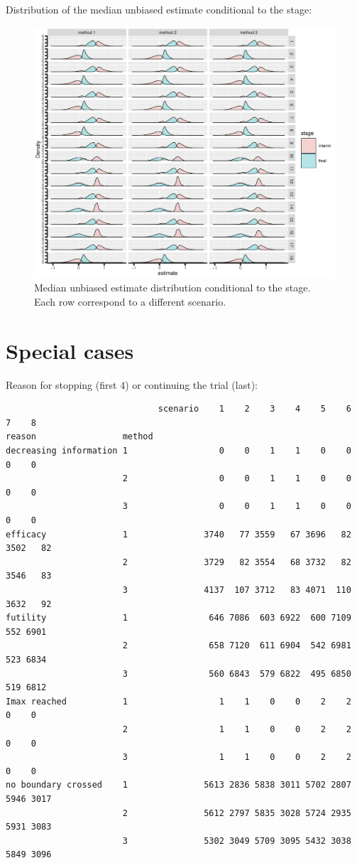 \documentclass[12pt]{article}
\begin{document}
Distribution of the median unbiased estimate conditional to the stage:
\begin{figure}[!h]
\centering
\includegraphics[trim={0 0 0 0},width=1\textwidth]{./figures/gg-estimateC-density.pdf}
\caption{Median unbiased estimate distribution conditional to the stage. Each row correspond to a different scenario.}
\end{figure}

\clearpage

\section{Special cases}
\label{sec:org7755a8d}

Reason for stopping (first 4) or continuing the trial (last):
\begin{verbatim}
                              scenario    1    2    3    4    5    6    7    8
reason                 method                                                 
decreasing information 1                  0    0    1    1    0    0    0    0
                       2                  0    0    1    1    0    0    0    0
                       3                  0    0    1    1    0    0    0    0
efficacy               1               3740   77 3559   67 3696   82 3502   82
                       2               3729   82 3554   68 3732   82 3546   83
                       3               4137  107 3712   83 4071  110 3632   92
futility               1                646 7086  603 6922  600 7109  552 6901
                       2                658 7120  611 6904  542 6981  523 6834
                       3                560 6843  579 6822  495 6850  519 6812
Imax reached           1                  1    1    0    0    2    2    0    0
                       2                  1    1    0    0    2    2    0    0
                       3                  1    1    0    0    2    2    0    0
no boundary crossed    1               5613 2836 5838 3011 5702 2807 5946 3017
                       2               5612 2797 5835 3028 5724 2935 5931 3083
                       3               5302 3049 5709 3095 5432 3038 5849 3096
\end{verbatim}
\end{document}
